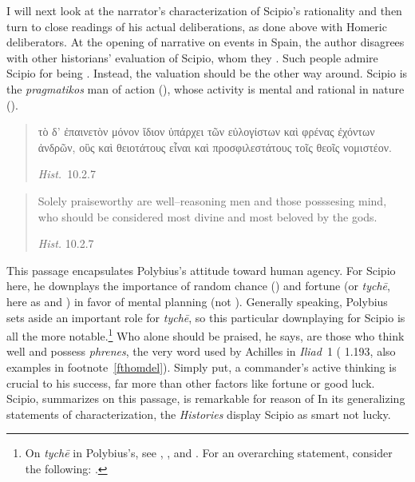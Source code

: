 \documentclass[12pt,letterpaper,oneside,final]{memoir}
\begin{document}
I will next look at the narrator's characterization of Scipio's rationality and then turn to close readings of his actual deliberations, as done above with Homeric deliberators. At the opening of narrative on events in Spain, the author disagrees with other historians' evaluation of Scipio, whom they . Such people admire Scipio for being . Instead, the valuation should be the other way around. Scipio is the \emph{pragmatikos} man of action (), whose activity is mental and rational in nature (). \blockquote[\emph{Hist.}~10.2.7]{\textgreek{τὸ δ' ἐπαινετὸν μόνον ἴδιον ὑπάρχει τῶν εὐλογίστων καὶ φρένας ἐχόντων ἀνδρῶν, οὓς καὶ θειοτάτους εἶναι καὶ προσφιλεστάτους τοῖς θεοῖς νομιστέον.}} \blockquote[\emph{Hist.} 10.2.7]{Solely praiseworthy are well--reasoning men and those posssesing mind, who should be considered most divine and most beloved by the gods.} This passage encapsulates Polybius's attitude toward human agency. For Scipio here, he downplays the importance of random chance () and fortune (or \emph{tychē}, here as  and ) in favor of mental planning (not ). Generally speaking, Polybius sets aside an important role for \emph{tychē}, so this particular downplaying for Scipio is all the more notable.\footnote{On \emph{tychē} in Polybius's, see \textcite[331--354]{pedech1964}, \textcite[136--140]{sacks1981}, and \textcite[195--201]{mcging2010}. For an overarching statement, consider the following: .} Who alone should be praised, he says, are those who think well and possess \emph{phrenes}, the very word used by Achilles in \emph{Iliad}~1 ( 1.193, also examples in footnote~\ref{fthomdel}). Simply put, a commander's active thinking is crucial to his success, far more than other factors like fortune or good luck. Scipio, summarizes \textcite{mcging2010} on this passage, is remarkable for reason of  In its generalizing statements of characterization, the \emph{Histories} display Scipio as smart not lucky.
\end{document}
